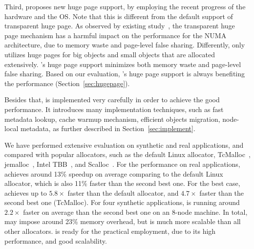  Third, \NM{} proposes new huge page support, by employing the recent progress of the hardware and the OS. Note that this is different from the default support of transparent huge page. As observed by existing study~\cite{Gaud:2014:LPM:2643634.2643659, DBLP:conf/asplos/PanwarBG19}, the transparent huge page mechanism has a harmful impact on the performance for the NUMA architecture, due to memory waste and page-level false sharing. Differently, \NM{} only utilizes huge pages for big objects and small objects that are allocated extensively. \NM{}'s huge page support minimizes both memory waste and page-level false sharing. Based on our evaluation, \NM{}'s huge page support is always benefiting the performance (Section~\ref{sec:hugepage}). 
 
 Besides that, \NM{} is implemented very carefully in order to achieve the good performance. It introduces many implementation techniques, such as fast metadata lookup, cache warmup mechanism, efficient objects migration, node-local metadata, as further described in Section~\ref{sec:implement}. 
 



We have performed extensive evaluation on synthetic and real applications, and compared \NM{} with popular allocators, such as the default Linux allocator, TcMalloc~\cite{tcmalloc}, jemalloc~\cite{jemalloc}, Intel TBB~\cite{tbb}, and Scalloc~\cite{Scalloc}. For the performance on real applications, \NM{} achieves around 13\% speedup on average comparing to the default Linux allocator, which is also 11\% faster than the second best one. For the best case, \NM{} achieves up to $5.8\times$ faster than the default allocator, and $4.7\times$ faster than the second best one (TcMalloc). For four synthetic applications, \NM{} is running around $2.2\times$ faster on average than the second best one on an 8-node machine. In total, \NM{} may impose around 23\% memory overhead, but is much more scalable than all other allocators.  \NM{} is ready for the practical employment, due to its high performance, and good scalability. 

